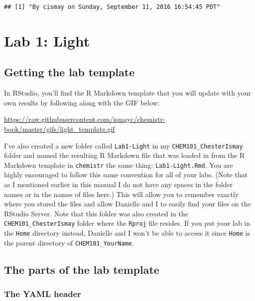 \documentclass[]{tufte-book}
\begin{document}
\begin{verbatim}
## [1] "By cismay on Sunday, September 11, 2016 16:54:45 PDT"
\end{verbatim}

\chapter{Lab 1: Light}\label{light}

\section{Getting the lab template}\label{getting-the-lab-template}

In RStudio, you'll find the R Markdown template that you will update
with your own results by following along with the GIF below:

\vspace{0.1in}

\begin{center}\footnotesize{\url{https://raw.githubusercontent.com/ismayc/chemistr-book/master/gifs/light_template.gif}}\end{center}

\vspace{0.1in}

I've also created a new folder called \texttt{Lab1-Light} in my
\texttt{CHEM101\_ChesterIsmay} folder and named the resulting R Markdown
file that was loaded in from the R Markdown template in
\texttt{chemistr} the same thing: \texttt{Lab1-Light.Rmd}. You are
highly encouraged to follow this same convention for all of your labs.
(Note that as I mentioned earlier in this manual I do not have any
spaces in the folder names or in the names of files here.) This will
allow you to remember exactly where you stored the files and allow
Danielle and I to easily find your files on the RStudio Server. Note
that this folder was also created in the \texttt{CHEM101\_ChesterIsmay}
folder where the \texttt{Rproj} file resides. If you put your lab in the
\texttt{Home} directory instead, Danielle and I won't be able to access
it since \texttt{Home} is the parent directory of
\texttt{CHEM101\_YourName}.

\section{The parts of the lab
template}\label{the-parts-of-the-lab-template}

\subsection{The YAML header}\label{the-yaml-header}
\end{document}
